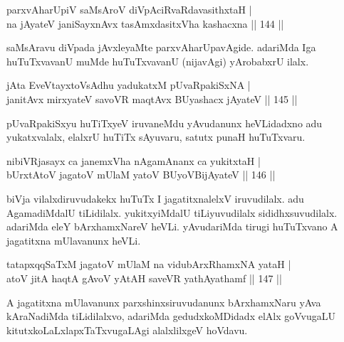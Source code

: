 \begin{shl}
parxvAharUpiV saMsAroV diVpAciRvaRdavasithxtaH |\\
na jAyateV janiSayxnAvx tasAmxdasitxVha kashacxna \hfill || 144 ||
\end{shl}

\begin{artha}
saMsAravu diVpada jAvxleyaMte parxvAharUpavAgide. adariMda Iga huTuTxvavanU muMde huTuTxvavanU (nijavAgi) yArobabxrU ilalx.
\end{artha}%


\begin{shl}
jAta EveVtayxtoV\s sAdhu yadukatxM pUvaRpakiSxNA |\\
janitAvx mirxyateV savoVR maqtAvx BUyashacx jAyateV \hfill || 145 ||
\end{shl}

\begin{artha}
pUvaRpakiSxyu huTiTxyeV iruvaneMdu yAvudanunx heVLidadxno adu yukatxvalalx, elalxrU huTiTx sAyuvaru, satutx punaH huTuTxvaru.
\end{artha}


\begin{shl}
nibiVRjasayx ca janemxVha nA\s \s gamAnanx ca yukitxtaH |\\
bUrxtAtoV jagatoV mUlaM yatoV BUyoV\s BijAyateV \hfill || 146 ||
\end{shl}

\begin{artha}
biVja vilalxdiruvudakekx huTuTx I jagatitxnalelxV iruvudilalx. adu AgamadiMdalU tiLidilalx. yukitxyiMdalU tiLiyuvudilalx sididhxsuvudilalx. adariMda eleY bArxhamxNareV heVLi. yAvudariMda tirugi huTuTxvano A jagatitxna mUlavanunx heVLi.
\end{artha}

\begin{shl}
tatapxqqSaTxM jagatoV mUlaM na vidubArxRhamxNA yataH |\\
atoV jitA haqtA gAvoV yAtAH saveVR yathAyathamf \hfill || 147 ||
\end{shl}

\begin{artha}
A jagatitxna mUlavanunx parxshinxsiruvudanunx bArxhamxNaru yAva kAraNadiMda tiLidilalxvo, adariMda gedudxkoMDidadx elAlx goVvugaLU kitutxkoLaLxlapxTaTxvugaLAgi alalxlilxgeV hoVdavu.
\end{artha}

